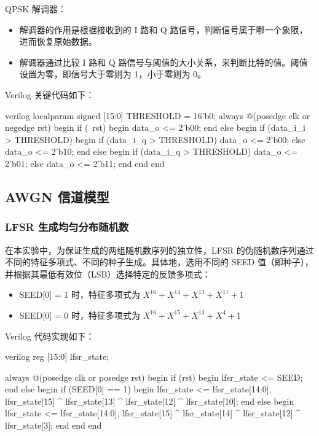QPSK 解调器：

\begin{itemize} 
    \item 解调器的作用是根据接收到的 I 路和 Q 路信号，判断信号属于哪一个象限，进而恢复原始数据。
    \item 解调器通过比较 I 路和 Q 路信号与阈值的大小关系，来判断比特的值。阈值设置为零，即信号大于零则为 1，小于零则为 0。
\end{itemize}

Verilog 关键代码如下：

\begin{codeblock}{verilog}
localparam signed [15:0] THRESHOLD = 16'b0;
always @(posedge clk or negedge rst) begin
    if (~rst) begin
        data_o <= 2'b00;
    end else begin
        if (data_i_i > THRESHOLD) begin
            if (data_i_q > THRESHOLD)   data_o <= 2'b00;
            else                        data_o <= 2'b10;
        end else begin
            if (data_i_q > THRESHOLD)   data_o <= 2'b01;
            else                        data_o <= 2'b11;
        end
    end
end
\end{codeblock}





\subsection{AWGN 信道模型}

\subsubsection{LFSR 生成均匀分布随机数}

在本实验中，为保证生成的两组随机数序列的独立性，LFSR 的伪随机数序列通过不同的特征多项式、不同的种子生成。具体地，选用不同的 SEED 值（即种子），并根据其最低有效位（LSB）选择特定的反馈多项式：

\begin{itemize} 
    \item SEED[0] = 1 时，特征多项式为 $X^{16} + X^{14} + X^{13} + X^{11} + 1$ 
    \item SEED[0] = 0 时，特征多项式为 $X^{16} + X^{15} + X^{13} + X^{4} + 1$ 
\end{itemize}

Verilog 代码实现如下：

\begin{codeblock}{verilog}
reg [15:0] lfsr_state;

always @(posedge clk or posedge rst) begin
    if (rst) begin
        lfsr_state <= SEED;
    end else begin
        if (SEED[0] == 1) begin
            lfsr_state <= {lfsr_state[14:0], lfsr_state[15] ^ lfsr_state[13] ^ lfsr_state[12] ^ lfsr_state[10]};
        end else begin
            lfsr_state <= {lfsr_state[14:0], lfsr_state[15] ^ lfsr_state[14] ^ lfsr_state[12] ^ lfsr_state[3]};
        end
    end
end
\end{codeblock}

